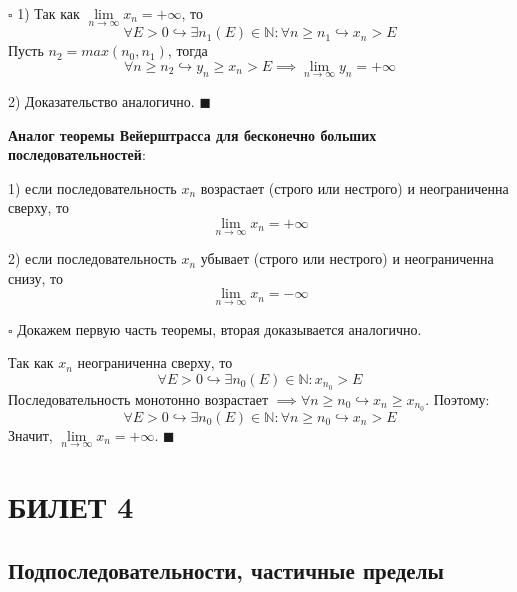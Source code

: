 \documentclass[12pt, a4paper, reqno]{article}
\begin{document}
    $\square$ 1) Так как $\lim\limits_{n\to\infty} x_n = +\infty$, то
    \begin{equation*}
        \forall E > 0 \hookrightarrow\exists n_1(E)\in\mathbb{N}: \forall n \geq n_1
        \hookrightarrow x_n > E
    \end{equation*}
    Пусть $n_2 = max(n_0, n_1)$, тогда
    \begin{equation*}
        \forall n \geq n_2 \hookrightarrow y_n \geq x_n > E \implies \lim\limits_{n\to\infty} y_n =
        +\infty
    \end{equation*}

    2) Доказательство аналогично. $\blacksquare$

    \textbf{Аналог теоремы Вейерштрасса для бесконечно больших последовательностей}:

    1) если последовательность $x_n$ возрастает (строго или нестрого) и неограниченна сверху, то
    \begin{equation*}
        \lim\limits_{n\to\infty} x_n = +\infty
    \end{equation*}

    2) если последовательность $x_n$ убывает (строго или нестрого) и неограниченна снизу, то
    \begin{equation*}
        \lim\limits_{n\to\infty} x_n = -\infty
    \end{equation*}

    $\square$ Докажем первую часть теоремы, вторая доказывается аналогично.

    Так как $x_n$ неограниченна сверху, то
    \begin{equation*}
        \forall E > 0 \hookrightarrow \exists n_0(E)\in\mathbb{N}: x_{n_0} > E
    \end{equation*}
    Последовательность монотонно возрастает $\implies \forall n \geq n_0 \hookrightarrow x_n\geq
    x_{n_0}$. Поэтому:
    \begin{equation*}
        \forall E > 0 \hookrightarrow \exists n_0(E)\in\mathbb{N}: \forall n \geq n_0
        \hookrightarrow x_n > E
    \end{equation*}
    Значит, $\lim\limits_{n\to\infty} x_n = +\infty$. $\blacksquare$

\newpage
\section{БИЛЕТ 4}

\subsection{Подпоследовательности, частичные пределы}
\end{document}
